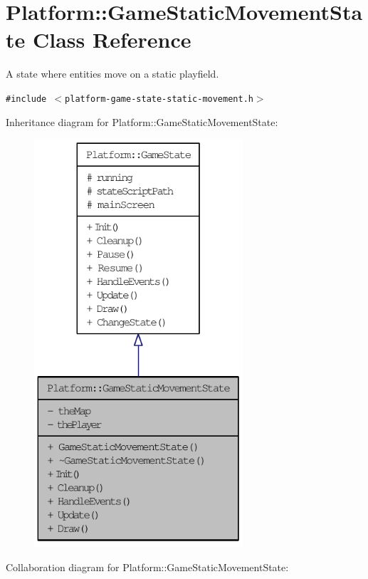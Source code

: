 \hypertarget{class_platform_1_1_game_static_movement_state}{
\section{Platform::GameStaticMovementState Class Reference}
\label{db/d55/class_platform_1_1_game_static_movement_state}
}
A state where entities move on a static playfield.  


{\tt \#include $<$platform-game-state-static-movement.h$>$}

Inheritance diagram for Platform::GameStaticMovementState:\nopagebreak
\begin{figure}[H]
\begin{center}
\leavevmode
\includegraphics[width=220pt]{db/d5c/class_platform_1_1_game_static_movement_state__inherit__graph}
\end{center}
\end{figure}
Collaboration diagram for Platform::GameStaticMovementState:\nopagebreak
